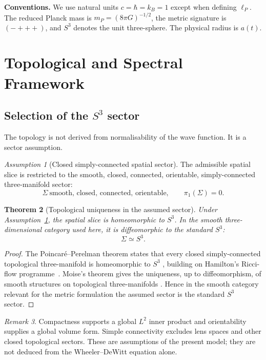 \documentclass[reprint,aps,prd,letterpaper,superscriptaddress,nofootinbib,longbibliography,floatfix]{revtex4-2}
\newtheorem{theorem}{Theorem}[section]
\theoremstyle{remark}
\newtheorem{remark}[theorem]{Remark}
\newtheorem{assumption}[theorem]{Assumption}
\newcommand{\mP}{m_P}
\begin{document}
\medskip
\noindent\textbf{Conventions.}
We use natural units \(c=\hbar=k_B=1\) except when defining \(\ell_P\).
The reduced Planck mass is \(\mP=(8\pi G)^{-1/2}\), the metric signature is
\((-+++) \), and \(S^3\) denotes the unit three-sphere.  The physical radius is
\(a(t)\).

\section{Topological and Spectral Framework}

\subsection{Selection of the \texorpdfstring{$S^3$}{S3} sector}

The topology is not derived from normalisability of the wave function.  It is a
sector assumption.

\begin{assumption}[Closed simply-connected spatial sector]
\label{ass:closed-sector}
The admissible spatial slice is restricted to the smooth, closed, connected,
orientable, simply-connected three-manifold sector:
\[
  \Sigma\ \text{smooth, closed, connected, orientable},
  \qquad \pi_1(\Sigma)=0 .
\]
\end{assumption}

\begin{theorem}[Topological uniqueness in the assumed sector]
\label{thm:topology}
Under Assumption~\ref{ass:closed-sector}, the spatial slice is homeomorphic to
\(S^3\).  In the smooth three-dimensional category used here, it is
diffeomorphic to the standard \(S^3\):
\[
  \Sigma \simeq S^3 .
\]
\end{theorem}

\begin{proof}
The Poincar\'e--Perelman theorem states that every closed simply-connected
topological three-manifold is homeomorphic to \(S^3\)
\cite{Perelman1,Perelman2,Perelman3}, building on Hamilton's Ricci-flow
programme~\cite{Hamilton}.  Moise's theorem gives the uniqueness, up to
diffeomorphism, of smooth structures on topological three-manifolds
\cite{Moise}.  Hence in the smooth category relevant for the metric formulation
the assumed sector is the standard \(S^3\) sector.
\end{proof}

\begin{remark}
Compactness supports a global \(L^2\) inner product and orientability supplies a
global volume form.  Simple connectivity excludes lens spaces and other closed
topological sectors.  These are assumptions of the present model; they are not
deduced from the Wheeler--DeWitt equation alone.
\end{remark}
\end{document}
